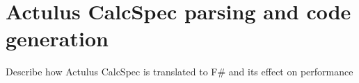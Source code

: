 \section{Actulus CalcSpec parsing and code generation}
Describe how Actulus CalcSpec is translated to F\# and its effect on performance